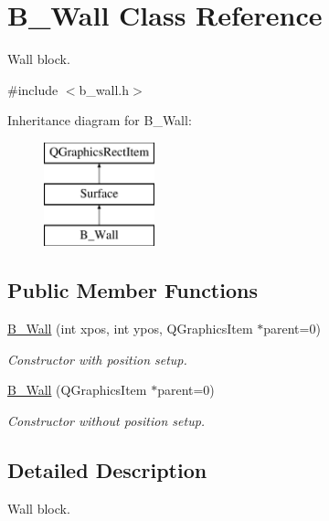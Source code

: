 \hypertarget{class_b___wall}{}\section{B\+\_\+\+Wall Class Reference}
\label{class_b___wall}


Wall block.  




{\ttfamily \#include $<$b\+\_\+wall.\+h$>$}

Inheritance diagram for B\+\_\+\+Wall\+:\begin{figure}[H]
\begin{center}
\leavevmode
\includegraphics[height=3.000000cm]{class_b___wall}
\end{center}
\end{figure}
\subsection*{Public Member Functions}
\begin{DoxyCompactItemize}
\item 
\hyperlink{class_b___wall_ad83db8883f6d620be7f9430b962c5774}{B\+\_\+\+Wall} (int xpos, int ypos, Q\+Graphics\+Item $\ast$parent=0)
\begin{DoxyCompactList}\small\item\em Constructor with position setup. \end{DoxyCompactList}\item 
\hyperlink{class_b___wall_a04cf7394644c9ca59a21e0e4dc1e63a6}{B\+\_\+\+Wall} (Q\+Graphics\+Item $\ast$parent=0)
\begin{DoxyCompactList}\small\item\em Constructor without position setup. \end{DoxyCompactList}\end{DoxyCompactItemize}


\subsection{Detailed Description}
Wall block. 

